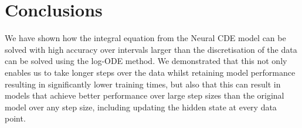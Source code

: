 \section{Conclusions}
We have shown how the integral equation from the Neural CDE model can be solved with high accuracy over intervals larger than the discretisation of the data can be solved using the log-ODE method. We demonstrated that this not only enables us to take longer steps over the data whilst retaining model performance resulting in significantly lower training times, but also that this can result in models that achieve better performance over large step sizes than the original model over any step size, including updating the hidden state at every data point. 

